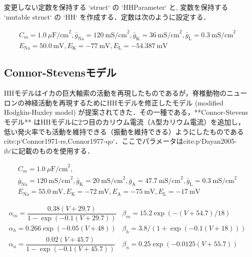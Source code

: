 \documentclass[titlepage]{ltjsbook}
\begin{document}
{変更しない定数を保持する `struct` の `HHParameter` と, 変数を保持する `mutable struct` の `HH` を作成する．定数は次のように設定する． 

$$
\begin{equation}
\begin{array}{l}
C_m=1.0\ \mu\textrm{F/cm}^2, \bar{g}_{\text{Na}}=120\ \textrm{mS/cm}^2, \bar{g}_{\text{K}}=36\ \textrm{mS/cm}^2, \bar{g}_{\text{L}}=0.3\ \textrm{mS/cm}^2\\
E_{\text{Na}}=50.0\ \textrm{mV}, E_{\text{K}}=-77\ \textrm{mV}, E_{\text{L}}=-54.387\ \textrm{mV} 
\end{array}
\end{equation}
$$
\subsection{Connor-Stevensモデル}
HHモデルはイカの巨大軸索の活動を再現したものであるが，脊椎動物のニューロンの神経活動を再現するためにHHモデルを修正したモデル (modified Hodgkin-Huxley model) が提案されてきた．その一種である，**Connor-Stevensモデル** はHHモデルに2つ目のカリウム電流（A型カリウム電流）を追加し，低い発火率でも活動を維持できる（振動を維持できる）ようにしたものである {cite:p}`Connor1971-rs,Connor1977-qo`．ここでパラメータは{cite:p}`Dayan2005-ib`に記載のものを使用する．

$$
\begin{equation}
\begin{array}{l}
C_m=1.0\ \mu\textrm{F/cm}^2,\\ 
\bar{g}_{\text{Na}}=120\ \textrm{mS/cm}^2, \bar{g}_{\text{K}}=20\ \textrm{mS/cm}^2, \bar{g}_{\text{A}}=47.7\ \textrm{mS/cm}^2, \bar{g}_{\text{L}}=0.3\ \textrm{mS/cm}^2\\
E_{\text{Na}}=55.0\ \textrm{mV}, E_{\text{K}}=-72\ \textrm{mV}, E_{\text{A}}=-75\ \textrm{mV},E_{\text{L}}=-17\ \textrm{mV} 
\end{array}
\end{equation}
$$

$$
\begin{equation}
\begin{array}{ll}
\alpha_m=\dfrac{0.38(V+29.7)}{1-\exp (-0.1(V+29.7))} & \beta_m=15.2 \exp (-(V+54.7)/18) \\
\alpha_h=0.266 \exp (-0.05(V+48)) & \beta_h=3.8 /(1+\exp (-0.1(V+18))) \\ 
\alpha_n=\dfrac{0.02(V+45.7)}{1-\exp (-0.1(V+45.7))} & \beta_n=0.25 \exp (-0.0125(V+55.7))
\end{array}
\end{equation}
$$

}
\end{document}
